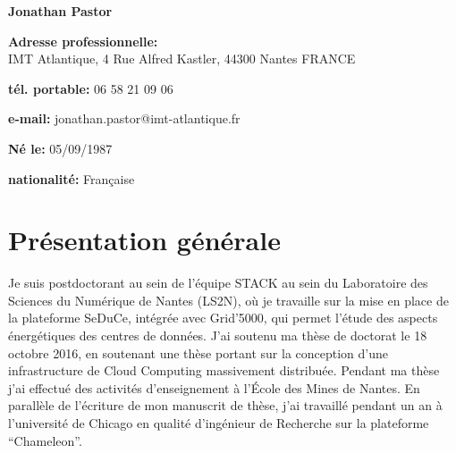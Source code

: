\documentclass[french,11pt,a4paper,sans]{moderncv}
\begin{document}
\makecvtitle

\textbf{Jonathan Pastor}

\vspace{5mm} %

\textbf{Adresse professionnelle:}
\\
IMT Atlantique, 4 Rue Alfred Kastler, 44300 Nantes FRANCE

\textbf{tél. portable:} 06 58 21 09 06

\textbf{e-mail:} jonathan.pastor@imt-atlantique.fr

\textbf{Né le:} 05/09/1987

\textbf{nationalité:} Française

\section{Présentation générale}

Je suis postdoctorant au sein de l'équipe STACK au sein du Laboratoire
des Sciences du Numérique de Nantes (LS2N), où je travaille sur la
mise en place de la plateforme SeDuCe, intégrée avec Grid'5000, qui
permet l'étude des aspects énergétiques des centres de données. J'ai
soutenu ma thèse de doctorat le 18 octobre 2016, en soutenant une
thèse portant sur la conception d'une infrastructure de Cloud
Computing massivement distribuée. Pendant ma thèse j'ai effectué des
activités d'enseignement à l'École des Mines de Nantes. En parallèle
de l'écriture de mon manuscrit de thèse, j'ai travaillé pendant un an
à l'université de Chicago en qualité d'ingénieur de Recherche sur la
plateforme ``Chameleon''.



\end{document}
